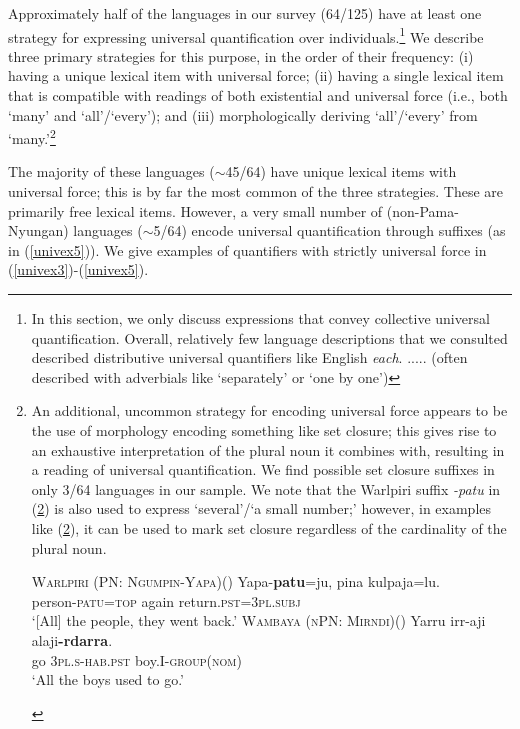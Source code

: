 \documentclass[12pt,egregdoesnotlikesansseriftitles]{scrartcl}
\makeatletter
\newcommand{\ofy}{/125} %
\makeatother
\begin{document}
Approximately half of the languages in our survey (64\ofy) have at least one strategy for expressing universal quantification over individuals.\footnote{In this section, we only discuss expressions that convey collective universal quantification. Overall, relatively few language descriptions that we consulted described distributive universal quantifiers like English \textit{each}. ..... (often described with adverbials like `separately' or `one by one') }  We describe three primary strategies for this purpose, in the order of their frequency: (i) having a unique lexical item with universal force; (ii) having a single lexical item that is compatible with readings of both existential and universal force (i.e., both `many' and `all'/`every'); and (iii)  morphologically deriving `all'/`every' from `many.'\footnote{An additional, uncommon strategy for encoding universal force appears to be the use of morphology encoding something like set closure; this gives rise to an exhaustive interpretation of the plural noun it combines with, resulting in a reading of universal quantification. We find possible set closure suffixes in only 3/64 languages in our sample. We note that the Warlpiri suffix \textit{-patu} in (\ref{patuex1}) is also used to express `several'/`a small number;' however, in examples like (\ref{patuex1}), it can be used to mark set closure regardless of the cardinality of the plural noun.

\begin{exe}
  \ex \textsc{Warlpiri (PN: Ngumpin-Yapa)}\hfill (\citealt[13--14]{bowler17})
  \gll Yapa-\textbf{patu}=ju, pina kulpaja=lu.\\
  person-\textsc{patu}=\textsc{top} again return.\textsc{pst}=\textsc{3pl.subj}\\
  \glt `[All] the people, they went back.'  \label{patuex1}
  \ex \textsc{Wambaya (nPN: Mirndi)}\hfill (\citealt[80]{nordlinger98})
  \gll Yarru irr-aji  alaji\textbf{-rdarra}.\\
  go  3\textsc{pl.s-hab.pst} boy.I-\textsc{group(nom)}\\
  \glt `All the boys used to go.' 
\end{exe}}

The majority of these languages ($\sim$45/64)  have unique lexical items with universal force; this is by far the most common of the three strategies. These are primarily free lexical items. However, a very small number of (non-Pama-Nyungan) languages ($\sim$5/64) encode universal quantification  through suffixes (as in (\ref{univex5})). We give examples of quantifiers with strictly universal force in (\ref{univex3})-(\ref{univex5}).
\end{document}
